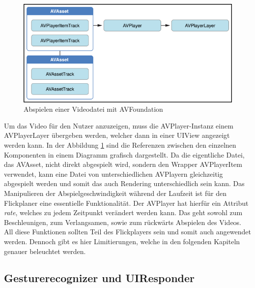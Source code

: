 \documentclass[11pt,a4paper]{report}
\begin{document}
\begin{figure}[h]
\begin{center}
\includegraphics[scale=1.1]{./images/23.png}
\caption{Abspielen einer Videodatei mit AVFoundation \cite{AVFoundationPlayback}}
\label{play_with_avfoundation}
\end{center}
\end{figure}
Um das Video für den Nutzer anzuzeigen, muss die AVPlayer-Instanz einem AVPlayerLayer übergeben werden, welcher dann in einer UIView angezeigt werden kann. In der Abbildung \ref{play_with_avfoundation} sind die Referenzen zwischen den einzelnen Komponenten in einem Diagramm grafisch dargestellt. Da die eigentliche Datei, das AVAsset, nicht direkt abgespielt wird, sondern den Wrapper AVPlayerItem verwendet, kann eine Datei von unterschiedlichen AVPlayern gleichzeitig abgespielt werden und somit das auch Rendering unterschiedlich sein kann. Das Manipulieren der Abspielgeschwindigkeit während der Laufzeit ist für den Flickplaner eine essentielle Funktionalität. Der AVPlayer hat hierfür ein Attribut \textit{rate}, welches zu jedem Zeitpunkt verändert werden kann. Das geht sowohl zum Beschleunigen, zum Verlangsamen, sowie zum rückwärts Abspielen des Videos. All diese Funktionen sollten Teil des Flickplayers sein und somit auch angewendet werden. Dennoch gibt es hier Limitierungen, welche in den folgenden Kapiteln genauer beleuchtet werden. \cite{AVFoundationPlayback}

\subsection{Gesturerecognizer und UIResponder}
\label{sec:Gesturerecognizer}
\end{document}
